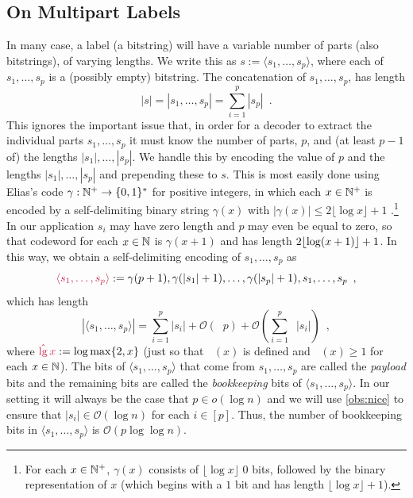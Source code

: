 \documentclass{patmorin}
\makeatletter
\renewcommand{\ge}{\geqslant}
\renewcommand{\le}{\leqslant}
\newcommand{\defin}[1]{\emph{\textcolor{brightmaroon}{#1}}}
\def\mathcolor#1#{\@mathcolor{#1}}
\def\@mathcolor#1#2#3{%
  \protect\leavevmode
  \begingroup
    \color#1{#2}#3%
  \endgroup
}
\newcommand{\mathdefin}[1]{\mathcolor{brightmaroon}{#1}}
\DeclareMathOperator{\lgg}{\hat{lg}}
\newcommand{\Oh}{\calO}
\newcommand{\calO}{\mathcal{O}}
\makeatother
\begin{document}
  \subsection{On Multipart Labels}
  \label{multipart}

  In many case, a label (a bitstring) will have a variable number of parts (also bitstrings), of varying lengths.  We write this as $s:=\langle s_1,\ldots,s_p\rangle$, where each of $s_1,\ldots,s_p$ is a (possibly empty) bitstring.  The concatenation of $s_1,\ldots,s_p$, has length
  \[
     \textstyle |s|=|s_1,\ldots,s_p|=\sum_{i=1}^p|s_p| \enspace .
  \]
  This ignores the important issue that, in order for a decoder to extract the individual parts $s_1,\ldots,s_p$ it must know the number of parts, $p$, and (at least $p-1$ of) the lengths $|s_1|,\ldots,|s_p|$.  We handle this by encoding the value of $p$ and the lengths $|s_1|,\ldots,|s_{p}|$ and prepending these to $s$. This is most easily done using Elias's code $\gamma:\mathbb{N}^+\to\{0,1\}^*$ for positive integers, in which each $x\in\mathbb{N}^+$ is encoded by a self-delimiting binary string $\gamma(x)$ with $|\gamma(x)|\le 2\lfloor \log x  \rfloor  + 1$ \cite{elias:universal}.\footnote{For each $x\in\mathbb{N}^+$, $\gamma(x)$ consists of $\lfloor\log x\rfloor$ 0 bits, followed by the binary representation of $x$ (which begins with a $1$ bit and has length $\lfloor\log x\rfloor+1$).} In our application $s_i$ may have zero length and $p$ may even be equal to zero, so that codeword for each $x\in\mathbb{N}$ is $\gamma(x+1)$ and has length $2{\lfloor \log (x+1) \rfloor}+1$.
  In this way, we obtain a self-delimiting encoding of $s_1,\ldots,s_p$ as
  \[  \mathdefin{\langle s_1,\ldots,s_p\rangle}:=\gamma(p+1),\gamma(|s_1|+1),\ldots,\gamma(|s_p|+1),s_1,\ldots,s_p \enspace ,
  \]
  which has length
  \begin{equation}
    |\langle s_1,\ldots,s_p\rangle| = \textstyle\sum_{i=1}^p|s_i|+\Oh(\lgg p) + \Oh(\sum_{i=1}^p\lgg|s_i|) \enspace , \label{encoding_cost}
  \end{equation}
  where $\mathdefin{\lgg x} := \log\max\{2,x\}$ (just so that $\lgg(x)$ is defined and $\lgg(x)\ge 1$ for each $x\in\mathbb{N}$).    The bits of $\langle s_1,\ldots,s_p\rangle$ that come from $s_1,\ldots,s_p$ are called the \defin{payload} bits and the remaining bits are called the \defin{bookkeeping} bits of $\langle s_1,\ldots,s_p\rangle$.
  In our setting it will always be the case that $p\in o(\log n)$ and we will use \cref{obs:nice} to ensure that $|s_i|\in \Oh(\log n)$ for each $i\in[p]$.
  Thus, the number of bookkeeping bits in $\langle s_1,\ldots,s_p\rangle$  is $\Oh(p\log\log n)$.
\end{document}
